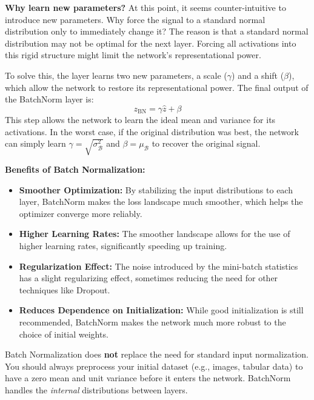 \documentclass{article}
\begin{document}
\textbf{Why learn new parameters?} At this point, it seems counter-intuitive to introduce new parameters. Why force the signal to a standard normal distribution only to immediately change it? The reason is that a standard normal distribution may not be optimal for the next layer. Forcing all activations into this rigid structure might limit the network's representational power.

To solve this, the layer learns two new parameters, a scale ($\gamma$) and a shift ($\beta$), which allow the network to restore its representational power. The final output of the BatchNorm layer is:
\begin{equation}
    z_{\text{BN}} = \gamma \hat{z} + \beta
\end{equation}
This step allows the network to learn the ideal mean and variance for its activations. In the worst case, if the original distribution was best, the network can simply learn $\gamma = \sqrt{\sigma^2_{\mathcal{B}}}$ and $\beta = \mu_{\mathcal{B}}$ to recover the original signal.

\begin{tcolorbox}
\textbf{Benefits of Batch Normalization:}
\begin{itemize}
    \item \textbf{Smoother Optimization:} By stabilizing the input distributions to each layer, BatchNorm makes the loss landscape much smoother, which helps the optimizer converge more reliably.
    \item \textbf{Higher Learning Rates:} The smoother landscape allows for the use of higher learning rates, significantly speeding up training.
    \item \textbf{Regularization Effect:} The noise introduced by the mini-batch statistics has a slight regularizing effect, sometimes reducing the need for other techniques like Dropout.
    \item \textbf{Reduces Dependence on Initialization:} While good initialization is still recommended, BatchNorm makes the network much more robust to the choice of initial weights.
\end{itemize}
\end{tcolorbox}

\begin{tcolorbox}
Batch Normalization does \textbf{not} replace the need for standard input normalization. You should always preprocess your initial dataset (e.g., images, tabular data) to have a zero mean and unit variance before it enters the network. BatchNorm handles the \textit{internal} distributions between layers.
\end{tcolorbox}
\end{document}
